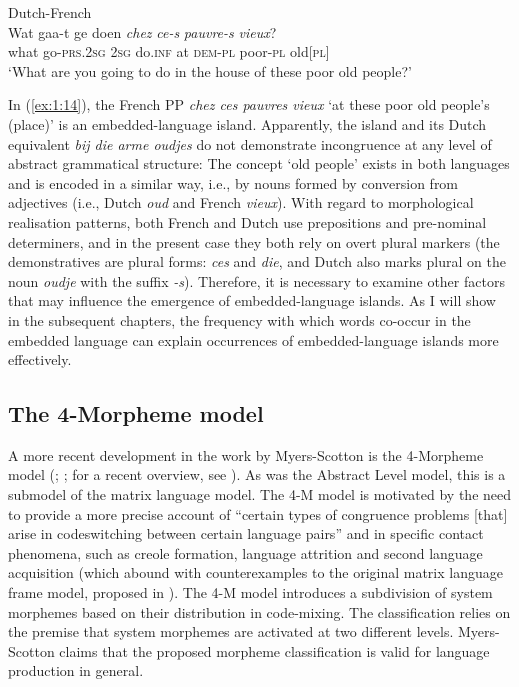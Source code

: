 \ea \label{ex:1:14}
Dutch-French \citep[208]{treffers-daller-mixing-1994}\\
\gll Wat gaa-t ge doen \textit{chez} \textit{ce-s} \textit{pauvre-s} \textit{vieux}?\\
	what go-\textsc{prs.2sg} \textsc{2sg} do.\textsc{inf} at \textsc{dem-pl} poor-\textsc{pl} old[\textsc{pl}]\\
\glt `What are you going to do in the house of these poor old people?'
\z

\noindent In (\ref{ex:1:14}), the French PP \textit{chez ces pauvres vieux} `at these poor old people's (place)' is an embedded-language island. Apparently, the island and its Dutch equivalent \textit{bij die arme oudjes} do not demonstrate incongruence at any level of abstract grammatical structure: The concept `old people' exists in both languages and is encoded in a similar way, i.e., by nouns formed by conversion from adjectives (i.e., Dutch \textit{oud} and French \textit{vieux}). With regard to morphological realisation patterns, both French and Dutch use prepositions and pre-nominal determiners, and in the present case they both rely on overt plural markers (the demonstratives are plural forms: \textit{ces} and \textit{die}, and Dutch also marks plural on the noun \textit{oudje} with the suffix \textit{-s}). Therefore, it is necessary to examine other factors that may influence the emergence of embedded-language islands. As I will show in the subsequent chapters, the frequency with which words co-occur in the embedded language can explain occurrences of embedded-language islands more effectively.

\subsection{The 4-Morpheme model}
A more recent development in the work by Myers-Scotton is the 4-Morpheme model (\citeyear{myers-scotton-matrix-2001}; \citeyear[73--82]{myers-scotton-contact-2002}; for a recent overview, see \citealt[][]{myers-scotton-jake16}). As was the Abstract Level model, this is a submodel of the matrix language model. The 4-M model is motivated by the need to provide a more precise account of ``certain types of congruence problems [that] arise in codeswitching between certain language pairs'' \citep[42]{myers-scotton-matrix-2001} and in specific contact phenomena, such as creole formation, language attrition and second language acquisition (which abound with counterexamples to the original matrix language frame model, proposed in \citealt{myers-scotton-duelling-1993}). The 4-M model introduces a subdivision of system morphemes based on their distribution in code-mixing. The classification relies on the premise that system morphemes are activated at two different levels. Myers-Scotton claims that the proposed morpheme classification is valid for language production in general.


